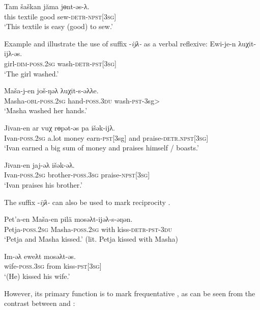\documentclass[output=paper]{langscibook}
\begin{document}
  	 \ex
	\label{ex:Volkova:47c}
  	 \gll Tam šaškan jăma jɵnt-əs-λ.\\
  	 this textile good sew\textsc{{}-detr-npst[3sg]}\\
  	 \glt ‘This textile is easy (good) to sew.’
	\z
\z

Example  and  illustrate the use of suffix -\textit{ijλ-} as a verbal reflexive: 
\ea 
\label{ex:Volkova:48}
	\ea
	\label{ex:Volkova:48a}
  	 \gll Ewi-je-n  λuχit-ijλ-əs.\\
  	 girl\textsc{{}-dim-poss.2sg} wash\textsc{{}-detr-pst[3sg]}\\
  	 \glt ‘The girl washed.’

	\ex
	\label{ex:Volkova:48b}
  	 \gll Maša-j-en još-ŋəλ λuχit-s-əλλe.\\
  	 Masha\textsc{{}-obl-poss.2sg} hand\textsc{{}-poss.3du} wash\textsc{{}-pst-}3sg>
\\
  	 \glt ‘Masha washed her hands.’
	\z
\z

\ea 
\label{ex:Volkova:49}
	\ea
	\label{ex:Volkova:49a}
  	 \gll Jivan-en ar vuχ rɵpət-əs pa išək-ijλ.\\
  Ivan\textsc{{}-poss.2sg} a.lot money earn\textsc{{}-pst[}3sg] and praise\textsc{{}-detr.npst[3sg]}\\
  	 \glt ‘Ivan earned a big sum of money and praises himself / boasts.’


	\ex
	\label{ex:Volkova:49b}
  	 \gll Jivan-en jaj-əλ išək-əλ.\\
  	 Ivan\textsc{{}-poss.2sg} brother\textsc{{}-poss.3sg} praise\textsc{{}-npst[3sg]}\\
  	 \glt ‘Ivan praises his brother.’
	\z
\z


The suffix -\textit{ijλ-} can also be used to mark reciprocity . 

\ea 
\label{ex:Volkova:50}
	\ea
	\label{ex:Volkova:50a}
  	 \gll Pet’a-en Maša-en pilä mosəλt-ijəλ-s-əŋən.\\
  	 Petja\textsc{{}-poss.2sg} Masha\textsc{{}-poss.2sg} with kiss\textsc{{}-detr-pst-3du}\\
  	 \glt ‘Petja and Masha kissed.’ (lit. Petja kissed with Masha)

	\ex
	\label{ex:Volkova:50b}
  	 \gll Im-əλ eweλt mosəλt-əs.\\
  	 wife-\textsc{poss.3sg} from kiss-\textsc{pst[3sg}]\\
  	 \glt ‘(He) kissed his wife.’
	\z
\z


However, its primary function is to mark frequentative \citep{Kaksin2007}, as can be seen from the contrast between  and :
\end{document}
